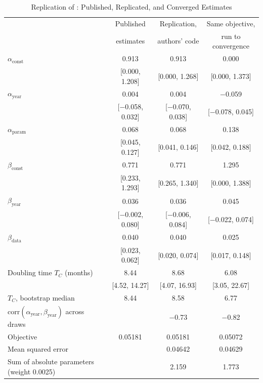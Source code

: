 \begin{table}[tp]
\centering
\caption{Replication of \citet{ho2024algorithmic}: Published, Replicated, and Converged Estimates}
\label{tab:app-ho-replication}
\footnotesize
\setlength{\tabcolsep}{5pt}
\begin{tabular}{@{}lccc@{}}
\toprule
 & Published & Replication, & Same objective, \\
 & estimates & authors' code & run to convergence \\
\midrule
$\alpha_{\text{const}}$ & 0.913 & 0.913 & 0.000 \\
 & [0.000, 1.208] & [0.000, 1.268] & [0.000, 1.373] \\
$\alpha_{\text{year}}$ & 0.004 & 0.004 & $-$0.059 \\
 & [$-$0.058, 0.032] & [$-$0.070, 0.038] & [$-$0.078, 0.045] \\
$\alpha_{\text{param}}$ & 0.068 & 0.068 & 0.138 \\
 & [0.045, 0.127] & [0.041, 0.146] & [0.042, 0.188] \\
$\beta_{\text{const}}$ & 0.771 & 0.771 & 1.295 \\
 & [0.233, 1.293] & [0.265, 1.340] & [0.000, 1.388] \\
$\beta_{\text{year}}$ & 0.036 & 0.036 & 0.045 \\
 & [$-$0.002, 0.080] & [$-$0.006, 0.084] & [$-$0.022, 0.074] \\
$\beta_{\text{data}}$ & 0.040 & 0.040 & 0.025 \\
 & [0.023, 0.062] & [0.020, 0.074] & [0.017, 0.148] \\
Doubling time $T_C$ (months) & 8.44 & 8.68 & 6.08 \\
 & [4.52, 14.27] & [4.07, 16.93] & [3.05, 22.67] \\
\addlinespace
$T_C$, bootstrap median & 8.44 & 8.58 & 6.77 \\
corr$(\alpha_{\text{year}},\beta_{\text{year}})$ across draws & & $-$0.73 & $-$0.82 \\
Objective & 0.05181 & 0.05181 & 0.05072 \\
\quad Mean squared error & & 0.04642 & 0.04629 \\
\quad Sum of absolute parameters (weight 0.0025) & & 2.159 & 1.773 \\
\bottomrule
\end{tabular}
\par\smallskip
{}
\end{table}
